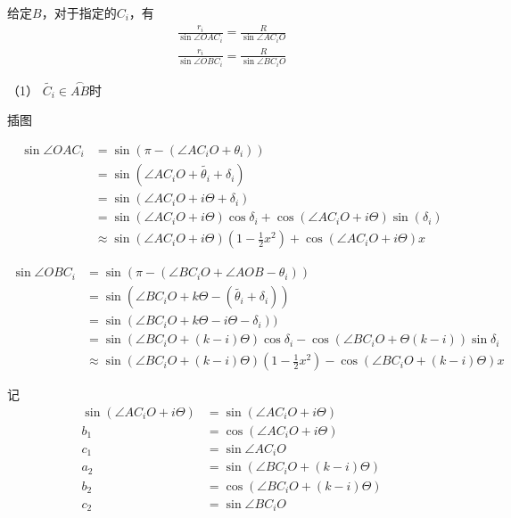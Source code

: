 \documentclass{ctexart}
\begin{document}
给定\(B\)，对于指定的\(C_i\)，有
\begin{align}
    \frac{r_i}{\sin{\angle OAC_i}} = \frac{R}{\sin\angle AC_iO}\label{eqCi1} \\
    \frac{r_i}{\sin{\angle OBC_i}} = \frac{R}{\sin\angle BC_iO}\label{eqCi2}
\end{align}

（1） $ \tilde{C_i}\in\overset{\frown}{AB} $时

插图

\begin{align*}
    \sin \angle OAC_i & =\sin(\pi - (\angle AC_iO + \theta_i)            )      \\
                 & =\sin(\angle AC_iO + \tilde{\theta_i}+\delta_i)\\
                 & =\sin(\angle AC_iO + i\Theta +\delta_i)\\
                 &=\sin(\angle AC_iO + i\Theta)\cos\delta_i + \cos(\angle AC_iO + i\Theta)\sin(\delta_i)\\
                 &\approx \sin(\angle AC_iO + i\Theta)(1-\frac{1}{2}x^2) + \cos(\angle AC_iO + i\Theta)x
\end{align*}

\begin{align*}
    \sin\angle OBC_i & =\sin(\pi - (\angle BC_iO + \angle AOB - \theta_i))\\
                 & = \sin (\angle BC_iO + k\Theta - (\tilde{\theta_i}+\delta_i))\\
                 & = \sin (\angle BC_iO + k\Theta - i\Theta - \delta_i))\\
                 & =  \sin (\angle BC_iO + (k - i)\Theta)\cos \delta_i-\cos  (\angle BC_iO + \Theta(k - i))\sin  \delta_i\\
                 & \approx \sin (\angle BC_iO + (k - i)\Theta)(1-\frac{1}{2}x^2)-\cos  (\angle BC_iO + (k - i)\Theta)x
\end{align*}

记
\begin{align*}
    \sin(\angle AC_iO + i\Theta) &=\sin(\angle AC_iO + i\Theta)\\
    b_1 &= \cos(\angle AC_iO + i\Theta)\\
    c_1 &= \sin\angle AC_iO\\
    a_2 &= \sin (\angle BC_iO + (k - i)\Theta)\\
    b_2 &= \cos  (\angle BC_iO + (k - i)\Theta)\\
    c_2 &= \sin\angle BC_iO\\
\end{align*}
\end{document}
